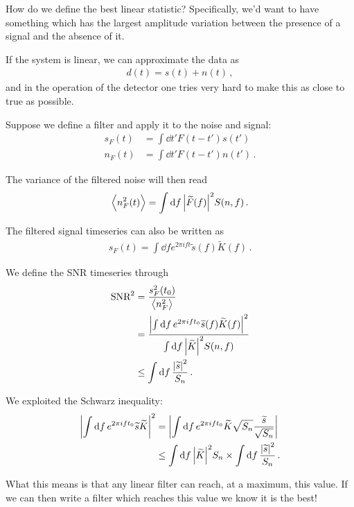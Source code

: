 \documentclass[main.tex]{subfiles}
\begin{document}
How do we define the best linear statistic? 
Specifically, we'd want to have something which has the largest amplitude variation between the presence of a signal and the absence of it. 

If the system is linear, we can approximate the data as 
%
\begin{align}
d(t) = s(t) + n(t)
\,,
\end{align}
%
and in the operation of the detector one tries very hard to make this as close to true as possible. 

Suppose we define a filter and apply it to the noise and signal: 
%
\begin{align}
s_F (t) &= \int \dd{t'} F(t-t') s(t') \\
n_F (t) &= \int \dd{t'} F(t-t') n(t') 
\,.
\end{align}

The variance of the filtered noise will then read 
%
\begin{align}
\expval{n_F^2(t)} = \int \dd{f} \abs{\widetilde{F}(f)}^2 S(n, f) 
\,.
\end{align}

The filtered signal timeseries can also be written as 
%
\begin{align}
s_F(t) = \int \dd{f} e^{2 \pi i ft} \widetilde{s}(f) \widetilde{K}(f)
\,.
\end{align}

We define the SNR timeseries through 
%
\begin{align}
\text{SNR}^2 &= \frac{s_F^2(t_0 )}{\expval{n_F^2}}  \\
&= \frac{\abs{\int \dd{f} e^{2 \pi i f t_0 } \widetilde{s}(f) \widetilde{K}(f)}^2}{\int \dd{f} \abs{\widetilde{K}}^2 S(n, f)} \\
&\leq \int \dd{f} \frac{\abs{\widetilde{s}}^2}{S_n}
\,.
\end{align}

We exploited the Schwarz inequality: 
%
\begin{align}
\abs{\int \dd{f} e^{2 \pi i ft_0 }\widetilde{s}\widetilde{K}}^2 &= \abs{\int \dd{f} e^{2 \pi i f t_0 } \widetilde{K} \sqrt{S_n} \frac{\widetilde{s}}{\sqrt{S_n}}}  \\
&\leq \int \dd{f} \abs{\widetilde{K}}^2 S_n \times  \int \dd{f} \frac{\abs{\widetilde{s}}^2}{S_n}
\,.
\end{align}

What this means is that any linear filter can reach, at a maximum, this value. 
If we can then write a filter which reaches this value we know it is the best! 
\end{document}
